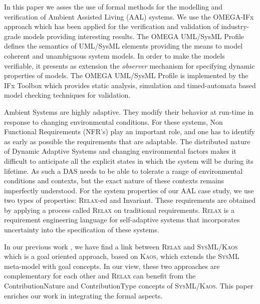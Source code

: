 \documentclass[a4paper,twoside]{article}
\def\myrelax{\textsc{Relax}}                  %
\def\sysml{\textsc{SysML}}
\def\kaos{\textsc{Kaos}}
\begin{document}
In this paper we asses the use of formal methods for the modelling and verification of Ambient Assisted Living (AAL) systems. We use the OMEGA-IFx approach which has been applied for the verification and validation of industry-grade models \cite{test2}  providing interesting results. The OMEGA UML/SysML Profile \cite{test3} defines the semantics of UML/SysML elements providing the means to model coherent and unambiguous system models. In order to make the models verifiable, it presents as extension the \textit{observer} mechanism for specifying dynamic properties of models. The OMEGA UML/SysML Profile is implemented by the IFx Toolbox \cite{test4} which provides static analysis, simulation and timed-automata based model checking \cite{test5} techniques for validation.

Ambient Systems are highly adaptive. They modify their behavior at run-time in response to changing environmental conditions. For these systems, Non Functional Requirements (NFR’s) play an important role, and one has to identify as early as possible the requirements that are adaptable. The distributed nature of Dynamic Adaptive Systems and changing environmental factors makes it difficult to anticipate all the explicit states in which the system will be during its lifetime. As such a DAS needs to be able to tolerate a range of environmental conditions and contexts, but the exact nature of these contexts remains imperfectly understood. For the system properties of our AAL case study, we use two types of properties: \myrelax{}-ed and Invariant. These requirements are obtained by applying a process called  \myrelax{} \cite{test6} on traditional requirements. \myrelax{}  is  a  requirement  engineering language for self-adaptive systems that incorporates uncertainty into the specification of these systems.

In our previous work \cite{test7}, we have find a link between \myrelax{} and \sysml{}/\kaos{}\cite{test8} which is a goal oriented approach, based on \kaos{}, which extends the \sysml{} meta-model with goal concepts. In our view, these two approaches are complementary for each other and \myrelax{} can benefit from the ContributionNature and ContributionType concepts of \sysml{}/\kaos{}.  This paper enriches our work in integrating the formal aspects.

\end{document}
